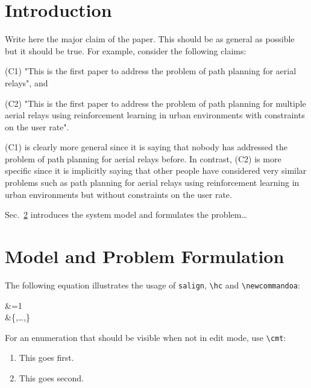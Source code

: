 \documentclass{article}
\begin{document}
\section{Introduction}
\begin{bullets}
    \blt[overview]

    \blt[motivation]


    \blt[novelty]Write here the major claim of the paper. This should be as general as possible but it should be true. For example, consider the following claims:
    \begin{bullets}%
         (C1) "This is the first paper to address the problem of path planning for aerial relays", and

         (C2)  "This is the first paper to address the problem of path planning for multiple aerial relays using reinforcement learning in urban environments with constraints on the user rate".
    \end{bullets}%
    (C1) is clearly more general since it is saying that nobody has addressed the problem of path planning for aerial relays before. In contrast, (C2) is more specific since it is implicitly saying that other people have considered very similar problems such as path planning for aerial relays using reinforcement learning in urban environments but without constraints on the user rate.


    \blt[contributions]

    Sec.~\ref{sec:model} introduces the system model and formulates the problem\ldots

    \blt[notation]
\end{bullets}

\section{Model and Problem Formulation}
\label{sec:model}

\begin{bullets}
    \blt[model]    The following equation illustrates the usage of \texttt{salign}, \texttt{\textbackslash hc} and \texttt{\textbackslash{}newcommandoa}:
    \begin{salign}[eq:globallabel]
        \label{eq:testequation}
        \testsymbol&=1\\
        \sectestsymbol &\in \{\sectestsymbol[0],\ldots,\sectestsymbol[N-1]\}
    \end{salign}

    For an enumeration that should be visible when not in edit mode, use \texttt{\textbackslash cmt}:
    \begin{enumerate}
        \item {} This goes first.
        \item {} This goes second.
    \end{enumerate}


\end{bullets}
\end{document}
